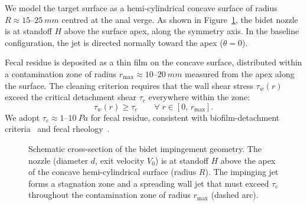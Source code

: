 \documentclass[aps,prfluids,reprint,amsmath,amssymb,floatfix]{revtex4-2}
\begin{document}
We model the target surface as a hemi-cylindrical concave surface of
radius $R \approx 15$--$\SI{25}{mm}$ centred at the anal verge. As shown
in Figure~\ref{fig:geometry}, the bidet nozzle is at standoff $H$ above
the surface apex, along the symmetry axis. In the baseline configuration,
the jet is directed normally toward the apex ($\theta = 0$).

Fecal residue is deposited as a thin film on the concave surface, distributed
within a contamination zone of radius $r_\mathrm{max} \approx 10$--$\SI{20}{mm}$
measured from the apex along the surface. The cleaning criterion requires
that the wall shear stress $\tau_w(r)$ exceed the critical detachment
shear $\tau_c$ everywhere within the zone:
\begin{equation}
  \tau_w(r) \geq \tau_c \qquad \forall\; r \in [0,\,r_\mathrm{max}].
  \label{eq:cleaning}
\end{equation}
We adopt $\tau_c \approx 1$--$\SI{10}{Pa}$ for fecal residue, consistent
with biofilm-detachment criteria~\citep{Ehedg2003} and fecal
rheology~\citep{Woolley2014}.

\begin{figure}[h]
\centering
{}
\caption{Schematic cross-section of the bidet impingement geometry.
The nozzle (diameter $d$, exit velocity $V_0$) is at standoff $H$ above
the apex of the concave hemi-cylindrical surface (radius $R$). The
impinging jet forms a stagnation zone and a spreading wall jet that
must exceed $\tau_c$ throughout the contamination zone of radius
$r_\mathrm{max}$ (dashed arc).}
\label{fig:geometry}
\end{figure}
\end{document}
